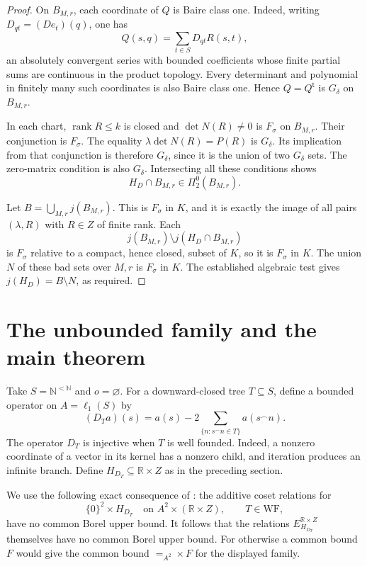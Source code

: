 \documentclass[11pt]{article}
\theoremstyle{definition}
\theoremstyle{remark}
\newcommand{\R}{\mathbb R}
\newcommand{\N}{\mathbb N}
\newcommand{\WF}{\mathrm{WF}}
\begin{document}
\begin{proof}
On $B_{M,r}$, each coordinate of $Q$ is Baire class one. Indeed, writing
$D_{qt}=(De_t)(q)$, one has
\[
 Q(s,q)=\sum_{t\in S}D_{qt}R(s,t),
\]
an absolutely convergent series with bounded coefficients whose finite
partial sums are continuous in the product topology. Every determinant
and polynomial in finitely many such coordinates is also Baire class
one. Hence $Q=Q^{\mathsf t}$ is $G_\delta$ on $B_{M,r}$.

In each chart, $\operatorname{rank}R\leq k$ is closed and
$\det N(R)\ne0$ is $F_\sigma$ on $B_{M,r}$. Their conjunction is
$F_\sigma$. The equality $\lambda\det N(R)=P(R)$ is $G_\delta$.
Its implication from that conjunction is therefore $G_\delta$, since it
is the union of two $G_\delta$ sets. The zero-matrix condition is also
$G_\delta$. Intersecting all these conditions shows
\[
 H_D\cap B_{M,r}\in\Pi^0_2(B_{M,r}).
\]

Let $B=\bigcup_{M,r}j(B_{M,r})$. This is $F_\sigma$ in $K$, and it is
exactly the image of all pairs $(\lambda,R)$ with $R\in Z$ of finite
rank. Each
\[
 j(B_{M,r})\setminus j(H_D\cap B_{M,r})
\]
is $F_\sigma$ relative to a compact, hence closed, subset of $K$, so it is
$F_\sigma$ in $K$. The union $N$ of these bad sets over $M,r$ is
$F_\sigma$ in $K$. The established algebraic test gives
$j(H_D)=B\setminus N$, as required.
\end{proof}


\section{The unbounded family and the main theorem}
Take $S=\N^{<\N}$ and $o=\varnothing$. For a downward-closed tree
$T\subseteq S$, define a bounded operator on $A=\ell_1(S)$ by
\[
 (D_Ta)(s)=a(s)-2\sum_{\{n:s^\frown n\in T\}}a(s^\frown n).
\]
The operator $D_T$ is injective when $T$ is well founded. Indeed, a
nonzero coordinate of a vector in its kernel has a nonzero child, and
iteration produces an infinite branch. Define $H_{D_T}\subseteq\R\times Z$
as in the preceding section.

We use the following exact consequence of
\cite[Corollary 6.1 and its proof]{Wang}: the additive coset relations for
\[
 \{0\}^2\times H_{D_T}\quad\text{on }A^2\times(\R\times Z),
 \qquad T\in\WF,
\]
have no common Borel upper bound. It follows that the relations
$E_{H_{D_T}}^{\R\times Z}$ themselves have no common Borel upper bound.
For otherwise a common bound $F$ would give the common bound
$=_{A^2}\times F$ for the displayed family.
\end{document}
